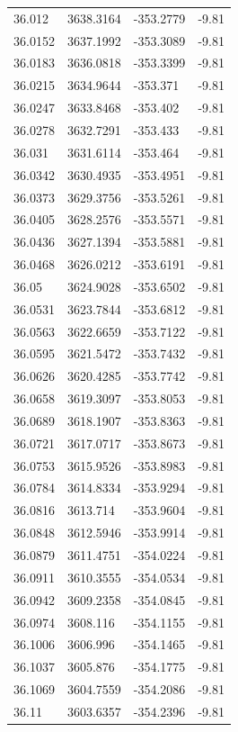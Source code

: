 \begin{table}[H]
\begin{tabular}{llll}
36.012 & 3638.3164 & -353.2779 & -9.81 \\
36.0152 & 3637.1992 & -353.3089 & -9.81 \\
36.0183 & 3636.0818 & -353.3399 & -9.81 \\
36.0215 & 3634.9644 & -353.371 & -9.81 \\
36.0247 & 3633.8468 & -353.402 & -9.81 \\
36.0278 & 3632.7291 & -353.433 & -9.81 \\
36.031 & 3631.6114 & -353.464 & -9.81 \\
36.0342 & 3630.4935 & -353.4951 & -9.81 \\
36.0373 & 3629.3756 & -353.5261 & -9.81 \\
36.0405 & 3628.2576 & -353.5571 & -9.81 \\
36.0436 & 3627.1394 & -353.5881 & -9.81 \\
36.0468 & 3626.0212 & -353.6191 & -9.81 \\
36.05 & 3624.9028 & -353.6502 & -9.81 \\
36.0531 & 3623.7844 & -353.6812 & -9.81 \\
36.0563 & 3622.6659 & -353.7122 & -9.81 \\
36.0595 & 3621.5472 & -353.7432 & -9.81 \\
36.0626 & 3620.4285 & -353.7742 & -9.81 \\
36.0658 & 3619.3097 & -353.8053 & -9.81 \\
36.0689 & 3618.1907 & -353.8363 & -9.81 \\
36.0721 & 3617.0717 & -353.8673 & -9.81 \\
36.0753 & 3615.9526 & -353.8983 & -9.81 \\
36.0784 & 3614.8334 & -353.9294 & -9.81 \\
36.0816 & 3613.714 & -353.9604 & -9.81 \\
36.0848 & 3612.5946 & -353.9914 & -9.81 \\
36.0879 & 3611.4751 & -354.0224 & -9.81 \\
36.0911 & 3610.3555 & -354.0534 & -9.81 \\
36.0942 & 3609.2358 & -354.0845 & -9.81 \\
36.0974 & 3608.116 & -354.1155 & -9.81 \\
36.1006 & 3606.996 & -354.1465 & -9.81 \\
36.1037 & 3605.876 & -354.1775 & -9.81 \\
36.1069 & 3604.7559 & -354.2086 & -9.81 \\
36.11 & 3603.6357 & -354.2396 & -9.81 \\

\end{tabular}
\end{table}
